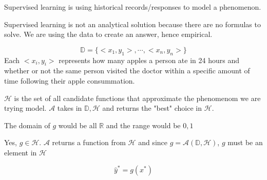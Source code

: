 \documentclass[12pt]{article}
\begin{document}
\begin{enumerate}

Supervised learning is using historical records/responses to model a phenomenon. 


Supervised learning is not an analytical solution because there are no formulas to solve. We are using the data to create an answer, hence empirical.

\begin{equation*}
\mathbb{D}=\{<x_1, y_1>, \cdots, <x_n, y_n>\}
\end{equation*}
Each $<x_i, y_i>$ represents how many apples a person ate in 24 hours and whether or not the same person visited the doctor within a specific amount of time following their apple consummation. 

$\mathcal{H}$ is the set of all candidate functions that approximate the phenomenom we are trying model. $\mathcal{A}$ takes in $\mathbb{D}, \mathcal{H}$ and returns the "best" choice in $\mathcal{H}$.


The domain of $g$ would be all $\mathbb{R}$ and the range would be ${0,1}$


Yes, $g \in \mathcal{H}$. $\mathcal{A}$ returns a function from $\mathcal{H}$ and since $g=\mathcal{A}(\mathbb{D}, \mathcal{H})$, $g$ must be an element in $\mathcal{H}$

\begin{equation*}
\hat{y}^*=g(x^*)
\end{equation*}



\end{enumerate}
\end{document}
